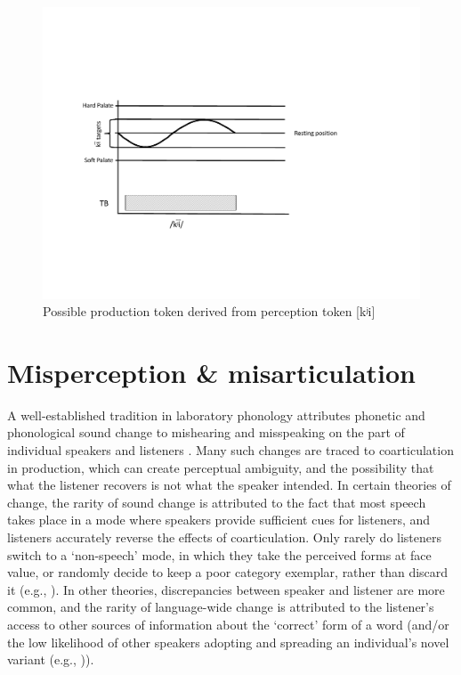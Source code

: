 \begin{figure}[H]
\centering{}\includegraphics[width=\textwidth]{figures/palatalizationc.pdf}\caption{\label{fig:Palatalizationc}Possible production token derived from
perception token {[}{kʲi}{]}}
\end{figure}


\section{\label{subsec:Misperception-=000026-Misarticulation}Misperception \& misarticulation}

A well-established tradition in laboratory phonology attributes phonetic
and phonological sound change to mishearing and misspeaking on the
part of individual speakers and listeners \citep{Ohala1980,Ohala1981,ohala1983origin,Ohala1990}.
Many such changes are traced to coarticulation in production, which
can create perceptual ambiguity, and the possibility that what the
listener recovers is not what the speaker intended. In certain theories
of change, the rarity of sound change is attributed to the fact that
most speech takes place in a mode where speakers provide sufficient
cues for listeners, and listeners accurately reverse the effects of
coarticulation. Only rarely do listeners switch to a `non-speech'
mode, in which they take the perceived forms at face value, or randomly
decide to keep a poor category exemplar, rather than discard it (e.g.,
\citealp{lindblom1990explaining,Garrett2013}). In other theories,
discrepancies between speaker and listener are more common, and the
rarity of language-wide change is attributed to the listener's access
to other sources of information about the `correct' form of a word
(and/or the low likelihood of other speakers adopting and spreading
an individual's novel variant (e.g., \citealt{Ohala1980})). 


